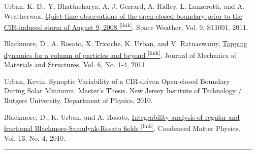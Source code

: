 \documentclass[10pt]{article}
\newcommand{\ressection}[1]{\noindent{\large\textbf{#1}}
\vspace{2pt}\hrule\vspace{4pt}}
\begin{document}
\begin{itemize*}
  \item
    Urban, K. D., Y. Bhattacharya, A. J. Gerrard, A. Ridley, L. Lanzerotti,
    and A. Weatherwax, 
    \href{http://onlinelibrary.wiley.com/doi/10.1029/2011SW000688/full}{Quiet-time
    observations of the open-closed boundary
    prior to the CIR-induced storm of August 9, 2008 \textsuperscript{\tiny{[link]}}}. Space Weather,
    Vol. 9, S11001, 2011.

  \item \label{itm:gran2}
    Blackmore, D., A. Rosato, X. Tricoche, K. Urban, and V. Ratnaswamy,
    \href{http://msp.berkeley.edu/jomms/2011/6-1/jomms-v6-n1-p06-s.pdf}{Tapping
    dynamics for a column of particles and beyond \textsuperscript{\tiny{[link]}}}. Journal of
    Mechanics of Materials and Structures, Vol. 6, No. 1-4, 2011.

  \item
    Urban, Kevin, 
    Synoptic Variability of a CIR-driven Open-closed
    Boundary During Solar Minimum. Master's Thesis. New Jersey Institute of
    Technology / Rutgers University, Department of Physics, 2010.

  \item \label{itm:gran3}
   Blackmore, D., K. Urban, and A. Rosato,
    \href{http://www.icmp.lviv.ua/journal/zbirnyk.64/}{Integrability analysis of regular and
    fractional Blackmore-Samulyak-Rosato fields \textsuperscript{\tiny{[link]}}}.  Condensed Matter
    Physics, Vol. 13, No. 4, 2010. 

\end{itemize*}






\vspace{0.2cm}
\ressection{Invited Presentations}
\end{document}
